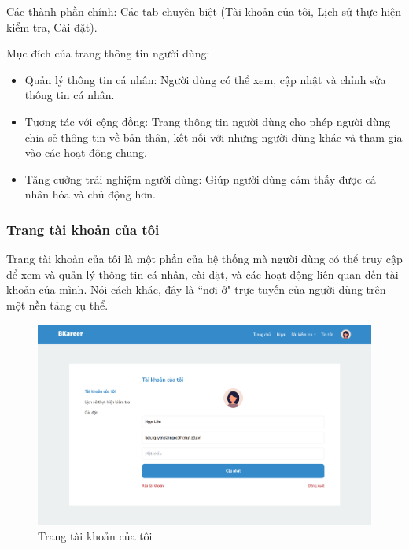 Các thành phần chính: Các tab chuyên biệt (Tài khoản của tôi, Lịch sử thực hiện kiểm tra, Cài đặt).

Mục đích của trang thông tin người dùng:
\begin{itemize}
    \item Quản lý thông tin cá nhân: Người dùng có thể xem, cập nhật và chỉnh sửa thông tin cá nhân.
    \item Tương tác với cộng đồng: Trang thông tin người dùng cho phép người dùng chia sẻ thông tin về bản thân, kết nối với những người dùng khác và tham gia vào các hoạt động chung.
    \item Tăng cường trải nghiệm người dùng: Giúp người dùng cảm thấy được cá nhân hóa và chủ động hơn.
\end{itemize}


\subsubsection{Trang tài khoản của tôi}
Trang tài khoản của tôi là một phần của hệ thống mà người dùng có thể truy cập để xem và quản lý thông tin cá nhân, cài đặt, và các hoạt động liên quan đến tài khoản của mình. Nói cách khác, đây là ``nơi ở" trực tuyến của người dùng trên một nền tảng cụ thể.

\begin{figure}[H]
    \centering
    \includegraphics[width=0.8\linewidth]{images/chap5/profileScreen.png}
    \vspace{0.5cm}
    \caption{Trang tài khoản của tôi}
\end{figure}

